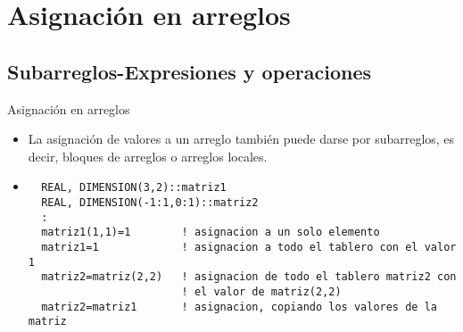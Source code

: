 
\section{Asignación en arreglos}  


\subsection{Subarreglos-Expresiones y operaciones}


\begin{frame}[fragile]{Asignación en arreglos}
 \begin{itemize}[<+(0)->]
  \item La asignación de valores a un arreglo también puede darse por subarreglos, es decir, bloques de arreglos o arreglos locales.
  \vspace{0.15 cm}
  \item [] 
  \begin{verbatim}
  REAL, DIMENSION(3,2)::matriz1
  REAL, DIMENSION(-1:1,0:1)::matriz2
  :
  matriz1(1,1)=1        ! asignacion a un solo elemento
  matriz1=1             ! asignacion a todo el tablero con el valor 1
  matriz2=matriz(2,2)   ! asignacion de todo el tablero matriz2 con
                        ! el valor de matriz(2,2)
  matriz2=matriz1       ! asignacion, copiando los valores de la matriz
  \end{verbatim}
 \end{itemize}
\end{frame}


